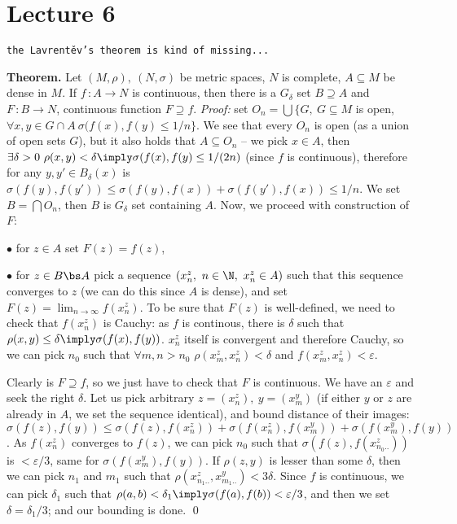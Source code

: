 \chapter{Lecture 6}
\centerline{\tt the Lavrent\v ev's theorem is kind of missing...}


{\bf Theorem.} Let $(M,\rho),\ (N,\sigma)$ be metric spaces, $N$ is complete,
$A\subseteq M$ be dense in $M$. If $f\,:A\to N$ is continuous, then there is a 
$G_\delta$ set $B\supseteq A$ and $F\,:B\to N$, continuous function $F\supseteq 
f$.
\smallskip
{\it Proof:} set $O_n = \bigcup \{G,\ G\subseteq M$ is open, $\forall x,y\in 
G\cap A\ \sigma(f(x),f(y)\leq 1/n\}$. We see that every $O_n$ is open (as a 
union of open sets $G$), but it also holds that $A\subseteq O_n$ -- we pick 
$x\in A$, then $\exists \delta > 0\ \rho(x,y) < \delta \imply \sigma (f(x),
f(y) \leq 1/(2n)$ (since $f$ is continuous), therefore for any $y,y' \in 
B_{\delta}(x)$ is $\sigma(f(y),f(y')) \leq \sigma(f(y),f(x)) + \sigma(f(y')
,f(x)) \leq 1/n$. We set $B=\bigcap O_n$, then $B$ is $G_\delta$ set containing 
$A$. Now, we proceed with construction of $F$:
{\parindent0.5in\parskip6pt
	\item{$\bullet$} for $z\in A$ set $F(z) = f(z)$,
	\item{$\bullet$} for $z\in B\bs A$ pick a sequence $(x_n^z,\ n\in \N,\ 
		x_n^z\in A)$ such that this sequence converges to $z$ (we can do this 
		since $A$ is dense), and set $F(z) = \lim_{n\to \infty} f(x_n^z)$. To 
		be sure that $F(z)$ is well-defined, we need to check that $f(x_n^z)$
		is Cauchy: as $f$ is continous, there is $\delta$ such that $\rho(x,
		y)\leq \delta\imply \sigma(f(x),f(y))$. $x_n^z$ itself is convergent 
		and therefore Cauchy, so we can pick $n_0$ such that $\forall m,n>n_0$
		$\rho(x_m^z,x_n^z) < \delta$ and $f(x_m^z,x_n^z) < \varepsilon$.

}
Clearly is $F\supseteq f$, so we just have to check that $F$ is continuous.
We have an $\varepsilon$ and seek the right $\delta$. Let us pick arbitrary 
$z = (x_n^z),\ y=(x_m^y)$ (if either $y$ or $z$ are already in $A$, we set the 
sequence identical), and bound distance of their images: $\sigma(f(z),f(y)) 
\leq \sigma(f(z),f(x_n^z)) +\sigma(f(x_n^z),f(x_m^y)) +\sigma(f(x_m^y),f(y))$.
As $f(x_n^z)$ converges to $f(z)$, we can pick $n_0$ such that $\sigma(f(z),
f(x_{n_0..}^z))$ is $<\varepsilon/3$, same for $\sigma(f(x_m^y),f(y))$. If 
$\rho(z,y)$ is lesser than some $\delta$, then we can pick $n_1$ and $m_1$ 
such that $\rho(x_{n_1..}^z,x_{m_1..}^y) < 3\delta$. Since $f$ is continuous, 
we can pick $\delta_1$ such that $\rho(a,b) < \delta_1 \imply \sigma(f(a),f(b))
< \varepsilon/3$, and then we set $\delta = \delta_1/3$; and our bounding is 
done.
\qed

